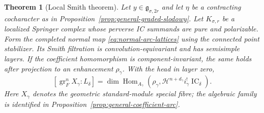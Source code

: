 \documentclass[10pt,a4paper]{amsart}
\newtheorem{theorem}{Theorem}[section]
\newcommand{\IC}{\operatorname{IC}}
\begin{document}
\begin{theorem}[Local Smith theorem]
\label{thm:general-local}
Let $y\in\mathfrak g_{\sigma,2r}$ and let $\eta$ be a contracting
cocharacter as in Proposition~\ref{prop:general-graded-slodowy}.
Let $K_{\sigma,r}$ be a localized Springer complex whose perverse IC
summands are pure and polarizable.  Form the completed normal map
\eqref{eq:normal-arc-lattices} using the connected point stabilizer.
Its Smith filtration is convolution-equivariant and has semisimple
layers.  If the coefficient homomorphism is component-invariant, the same holds after
projection to an enhancement $\rho_\gamma$.  With the head in layer
zero,
\[
 [\operatorname{gr}_F^nX_\gamma:L_\delta]
 =\dim\operatorname{Hom}_{A_\gamma}\!\left(
 \rho_\gamma,\mathcal H^{n+d_\gamma}i_\gamma^!\IC_\delta\right).
\]
Here $X_\gamma$ denotes the geometric standard-module special fibre;
the algebraic family is identified in
Proposition~\ref{prop:general-coefficient-arc}.
\end{theorem}
\end{document}
